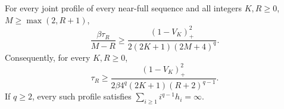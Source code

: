 \begin{theorem}\label{thm:necessary-hop-tail}
For every joint profile of every near-full sequence and all integers
$K,R\ge0$, $M\ge\max(2,R+1)$,
\begin{equation}\label{eq:necessary-hop-tail}
 \frac{\beta\tau_R}{M-R}
 \ge \frac{(1-V_K)_+^2}{2(2K+1)(2M+4)^q}.
\end{equation}
Consequently, for every $K,R\ge0$,
\begin{equation}\label{eq:tail-floor}
 \tau_R\ge
 \frac{(1-V_K)_+^2}{2\beta4^q(2K+1)(R+2)^{q-1}}.
\end{equation}
If $q\ge2$, every such profile satisfies
$\sum_{i\ge1}i^{q-1}h_i=\infty$.
\end{theorem}
